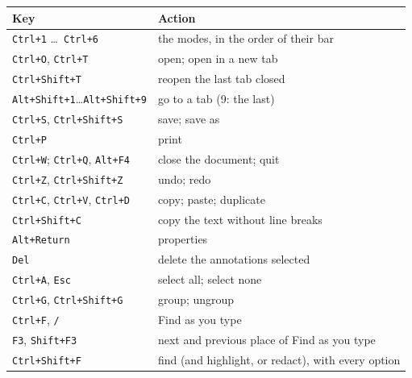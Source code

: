 \documentclass[12pt,
              article,
              oneside
              ]{memoir}
\newcommand*{\key}[1]{\texttt{#1}}
\begin{document}
%
\begin{longtable}{@{}>{\raggedright}p{}p{}@{}}
\toprule
Key & Action\\
\midrule
\endhead
\key{Ctrl+1} \ldots\ \key{Ctrl+6} & the modes, in the order of their bar\\
\key{Ctrl+O}, \key{Ctrl+T} & open; open in a new tab\\
\key{Ctrl+Shift+T} & reopen the last tab closed\\
\key{Alt+Shift+1}\ldots\key{Alt+Shift+9} & go to a tab (9: the last)\\
\key{Ctrl+S}, \key{Ctrl+Shift+S} & save; save as\\
\key{Ctrl+P} & print\\
\key{Ctrl+W}; \key{Ctrl+Q}, \key{Alt+F4} & close the document; quit\\
\key{Ctrl+Z}, \key{Ctrl+Shift+Z} & undo; redo\\
\key{Ctrl+C}, \key{Ctrl+V}, \key{Ctrl+D} & copy; paste; duplicate\\
\key{Ctrl+Shift+C} & copy the text without line breaks\\
\key{Alt+Return} & properties\\
\key{Del} & delete the annotations selected\\
\key{Ctrl+A}, \key{Esc} & select all; select none\\
\key{Ctrl+G}, \key{Ctrl+Shift+G} & group; ungroup\\
\key{Ctrl+F}, \key{/} & Find as you type\\
\key{F3}, \key{Shift+F3} & next and previous place of Find as you type\\
\key{Ctrl+Shift+F} & find (and highlight, or redact), with every option\\

\end{longtable}
\end{document}
